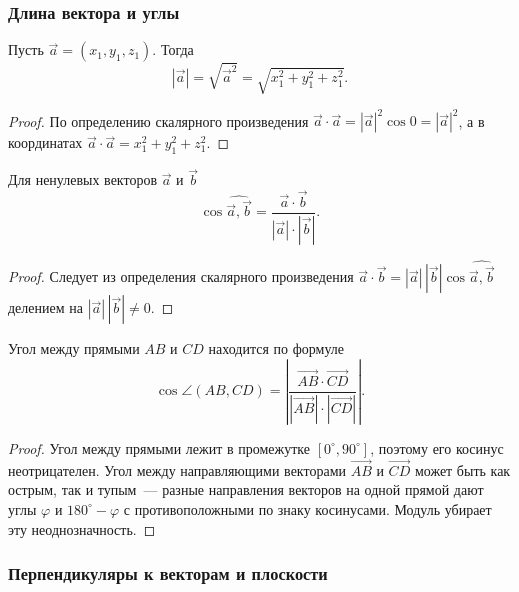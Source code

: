 \documentclass[12pt]{article}
\begin{document}
    \subsubsection{Длина вектора и углы}
    
    \begin{statement}
    	Пусть $\vec{a} = (x_1, y_1, z_1)$. Тогда
    	\[
    		|\vec{a}| = \sqrt{\vec{a}^2} = \sqrt{x_1^2 + y_1^2 + z_1^2}.
    	\]
    \end{statement}
    
    \begin{proof}
    	По определению скалярного произведения $\vec{a} \cdot \vec{a} = |\vec{a}|^2 \cos 0 = |\vec{a}|^2$, а в координатах $\vec{a} \cdot \vec{a} = x_1^2 + y_1^2 + z_1^2$.
    \end{proof}
    
    \begin{statement}
    	Для ненулевых векторов $\vec{a}$ и $\vec{b}$
    	\[
    		\cos \widehat{\vec{a}, \vec{b}} = \dfrac{\vec{a} \cdot \vec{b}}{|\vec{a}| \cdot |\vec{b}|}.
    	\]
    \end{statement}
    
    \begin{proof}
    	Следует из определения скалярного произведения $\vec{a} \cdot \vec{b} = |\vec{a}| \, |\vec{b}| \cos \widehat{\vec{a}, \vec{b}}$ делением на $|\vec{a}| \, |\vec{b}| \ne 0$.
    \end{proof}
    
    \begin{statement}
    	Угол между прямыми $AB$ и $CD$ находится по формуле
    	\[
    		\cos \angle (AB, CD) = \left| \dfrac{\vec{AB} \cdot \vec{CD}}{|\vec{AB}| \cdot |\vec{CD}|} \right|.
    	\]
    \end{statement}
    
    \begin{proof}
    	Угол между прямыми лежит в промежутке $[0^\circ, 90^\circ]$, поэтому его косинус неотрицателен. Угол между направляющими векторами $\vec{AB}$ и $\vec{CD}$ может быть как острым, так и тупым~--- разные направления векторов на одной прямой дают углы $\varphi$ и $180^\circ - \varphi$ с противоположными по знаку косинусами. Модуль убирает эту неоднозначность.
    \end{proof}
    
    \subsubsection{Перпендикуляры к векторам и плоскости}
    
\end{document}
